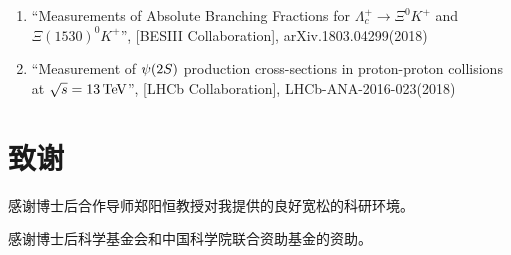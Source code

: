 \begin{enumerate}
\item ``Measurements of Absolute Branching Fractions for $\Lambda^+_c\to\Xi^0K^+$ and $\Xi(1530)^0K^+$'', [BESIII Collaboration], arXiv.1803.04299(2018)
\item ``Measurement of ${\psi{(2S)}}$ production cross-sections in proton-proton collisions at $\protect\sqrt{s}=13\mathrm{\,Te\kern -0.1em V}$'', [LHCb Collaboration], LHCb-ANA-2016-023(2018)
\end{enumerate}


%

%

\chapter[致谢]{致\quad 谢}%
\thispagestyle{noheaderstyle}%

感谢博士后合作导师郑阳恒教授对我提供的良好宽松的科研环境。

感谢博士后科学基金会和中国科学院联合资助基金的资助。

\cleardoublepage[plain]%
